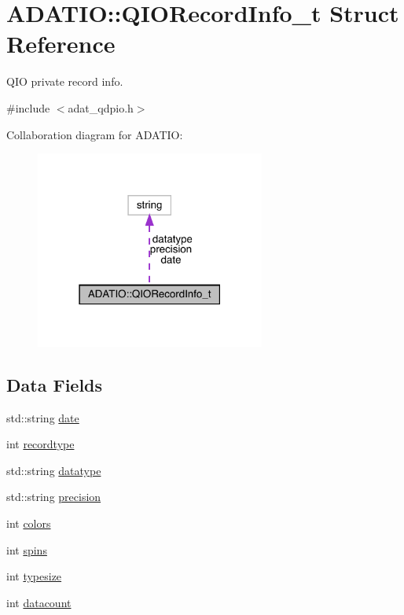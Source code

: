\hypertarget{structADATIO_1_1QIORecordInfo__t}{}\section{A\+D\+A\+T\+IO\+:\+:Q\+I\+O\+Record\+Info\+\_\+t Struct Reference}
\label{structADATIO_1_1QIORecordInfo__t}


Q\+IO private record info.  




{\ttfamily \#include $<$adat\+\_\+qdpio.\+h$>$}



Collaboration diagram for A\+D\+A\+T\+IO\+:\nopagebreak
\begin{figure}[H]
\begin{center}
\leavevmode
\includegraphics[width=214pt]{dd/d93/structADATIO_1_1QIORecordInfo__t__coll__graph}
\end{center}
\end{figure}
\subsection*{Data Fields}
\begin{DoxyCompactItemize}
\item 
std\+::string \mbox{\hyperlink{group__qio_ga1894a21fc67312581fac55295c8941e6}{date}}
\item 
int \mbox{\hyperlink{group__qio_ga88cd070912edbe6d09a2437d3d9c6d08}{recordtype}}
\item 
std\+::string \mbox{\hyperlink{group__qio_ga62e8335fcf5ac25dc36eaeee8519ee64}{datatype}}
\item 
std\+::string \mbox{\hyperlink{group__qio_gaba8466af5dd242de9e6d63fc5112e6df}{precision}}
\item 
int \mbox{\hyperlink{group__qio_gad7bee26b17d771036f2b87c847328b24}{colors}}
\item 
int \mbox{\hyperlink{group__qio_ga1a819261ad8c96e3e9378fc74742b1f4}{spins}}
\item 
int \mbox{\hyperlink{group__qio_ga415fb0076e8a07dddb97c8c5d6ea08f9}{typesize}}
\item 
int \mbox{\hyperlink{group__qio_ga8051a480bb96231cfa758ddfab5ed415}{datacount}}
\end{DoxyCompactItemize}


